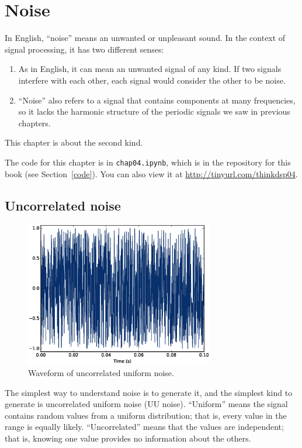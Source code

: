 \documentclass[12pt]{book}
\begin{document}
\chapter{Noise}

In English, ``noise'' means an unwanted or unpleasant sound.  In the
context of signal processing, it has two different senses:

\begin{enumerate}

\item As in English, it can mean an unwanted signal of any kind.  If
two signals interfere with each other, each signal would consider
the other to be noise.

\item ``Noise'' also refers to a signal that contains components at
many frequencies, so it lacks the harmonic structure of the periodic
signals we saw in previous chapters.  

\end{enumerate}

This chapter is about the second kind.

The code for this chapter is in {\tt chap04.ipynb}, which is in the
repository for this book (see Section~\ref{code}).
You can also view it at \url{http://tinyurl.com/thinkdsp04}.


\section{Uncorrelated noise}

\begin{figure}
\centerline{\includegraphics[height=2.5in]{figs/whitenoise0.eps}}
\caption{Waveform of uncorrelated uniform noise.}
\label{fig.whitenoise0}
\end{figure}

The simplest way to understand noise is to generate it, and the
simplest kind to generate is uncorrelated uniform noise (UU noise).
``Uniform'' means the signal contains random values from a uniform
distribution; that is, every value in the range is equally likely.
``Uncorrelated'' means that the values are independent; that is,
knowing one value provides no information about the others.
\end{document}
